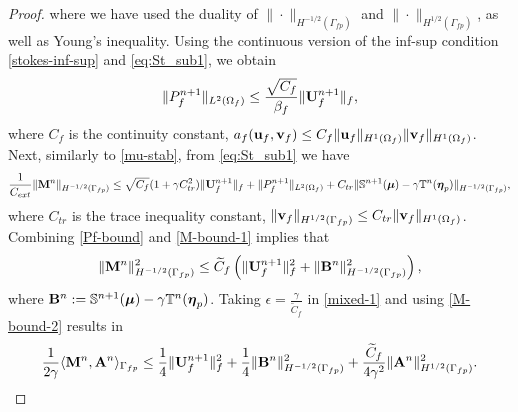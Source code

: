\documentclass[11pt]{article}
\def\u{{\bf u}}
\def\bv{{\bf v}}
\def\bbeta{\boldsymbol{\eta}}
\def\bmu{\boldsymbol{\mu}}
\def\U{{\bf U}}
\def\M{{\bf M}}
\def\A{{\bf A}}
\def\B{{\bf B}}
\def\O{\Omega}
\def\<{\langle}
\def\>{\rangle}
\begin{document}
\begin{proof}
%
where we have used the duality of $\|\cdot\|_{H^{-1/2}(\Gamma_{fp})}$ and $\|\cdot\|_{H^{1/2}(\Gamma_{fp})}$, as well as Young's inequality. Using the continuous version of the inf-sup condition \eqref{stokes-inf-sup} and \eqref{eq:St_sub1}, we obtain
%
\begin{equation}\label{Pf-bound}
  \|P_f^{n+1}\|_{L^2(\Omega_f)} \le \frac{\sqrt{C_f}}{\beta_f}\|\U_f^{n+1}\|_f,
\end{equation}
%
where $C_f$ is the continuity constant,
$a_f(\u_f,\bv_f) \le C_f \|\u_f\|_{H^1(\Omega_f)}\|\bv_f\|_{H^1(\Omega_f)}$.
Next, similarly to \eqref{mu-stab}, from \eqref{eq:St_sub1} we have
%
\begin{equation}\label{M-bound-1}
  \frac{1}{C_{ext}}  \|\M^n\|_{H^{-1/2}(\Gamma_{fp})} \le \sqrt{C_f}(1+\gamma C_{tr}^2)\|\U_f^{n+1}\|_f
  + \|P_f^{n+1}\|_{L^2(\Omega_f)}
    + C_{tr}\|\mathbb{S}^{n+1}(\bmu) - \gamma \mathbb{T}^n(\bbeta_p)\|_{H^{-1/2}(\Gamma_{fp})},
\end{equation}
%
where $C_{tr}$ is the trace inequality constant,
$\|\bv_f\|_{H^{1/2}(\Gamma_{fp})} \le C_{tr} \|\bv_f\|_{H^1(\O_f)}$.
Combining \eqref{Pf-bound} and \eqref{M-bound-1} implies that
%
\begin{equation}\label{M-bound-2}
\|\M^n\|_{H^{-1/2}(\Gamma_{fp})}^2 \le \widetilde C_f \left( \|\U_f^{n+1}\|_f^2 + \|\B^n\|_{H^{-1/2}(\Gamma_{fp})}^2\right),
\end{equation}
%
where $\B^n:= \mathbb{S}^{n+1}(\bmu) - \gamma \mathbb{T}^n(\bbeta_p)$. Taking $\epsilon = \frac{\gamma}{\widetilde C_f}$ in \eqref{mixed-1} and using \eqref{M-bound-2} results in 
%
\begin{equation}\label{mixed-2}
\frac{1}{2\gamma}\<\M^n,\A^n\>_{\Gamma_{fp}} \le \frac14\|\U_f^{n+1}\|_f^2 + \frac14\|\B^n\|_{H^{-1/2}(\Gamma_{fp})}^2 + \frac{\widetilde C_f}{4\gamma^2}\|\A^n\|_{H^{1/2}(\Gamma_{fp})}^2.
\end{equation}


\end{proof}
\end{document}
